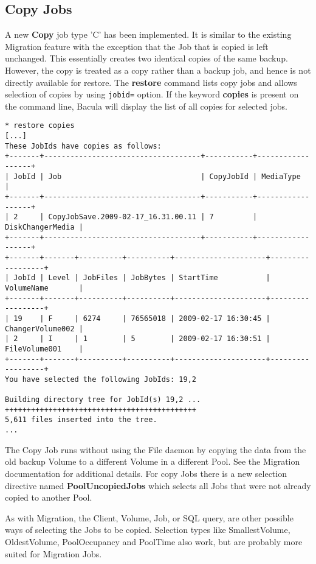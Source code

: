 \subsection{Copy Jobs}

A new {\bf Copy} job type 'C' has been implemented. It is similar to the
existing Migration feature with the exception that the Job that is copied is
left unchanged.  This essentially creates two identical copies of the same
backup. However, the copy is treated as a copy rather than a backup job, and
hence is not directly available for restore.  The {\bf restore} command lists
copy jobs and allows selection of copies by using \texttt{jobid=}
option. If the keyword {\bf copies} is present on the command line, Bacula will
display the list of all copies for selected jobs.

\begin{verbatim}
* restore copies
[...]
These JobIds have copies as follows:
+-------+------------------------------------+-----------+------------------+
| JobId | Job                                | CopyJobId | MediaType        |
+-------+------------------------------------+-----------+------------------+
| 2     | CopyJobSave.2009-02-17_16.31.00.11 | 7         | DiskChangerMedia |
+-------+------------------------------------+-----------+------------------+
+-------+-------+----------+----------+---------------------+------------------+
| JobId | Level | JobFiles | JobBytes | StartTime           | VolumeName       |
+-------+-------+----------+----------+---------------------+------------------+
| 19    | F     | 6274     | 76565018 | 2009-02-17 16:30:45 | ChangerVolume002 |
| 2     | I     | 1        | 5        | 2009-02-17 16:30:51 | FileVolume001    |
+-------+-------+----------+----------+---------------------+------------------+
You have selected the following JobIds: 19,2

Building directory tree for JobId(s) 19,2 ...  ++++++++++++++++++++++++++++++++++++++++++++
5,611 files inserted into the tree.
...
\end{verbatim}


The Copy Job runs without using the File daemon by copying the data from the
old backup Volume to a different Volume in a different Pool. See the Migration
documentation for additional details. For copy Jobs there is a new selection
directive named {\bf PoolUncopiedJobs} which selects all Jobs that were
not already copied to another Pool. 

As with Migration, the Client, Volume, Job, or SQL query, are
other possible ways of selecting the Jobs to be copied. Selection
types like SmallestVolume, OldestVolume, PoolOccupancy and PoolTime also
work, but are probably more suited for Migration Jobs. 

